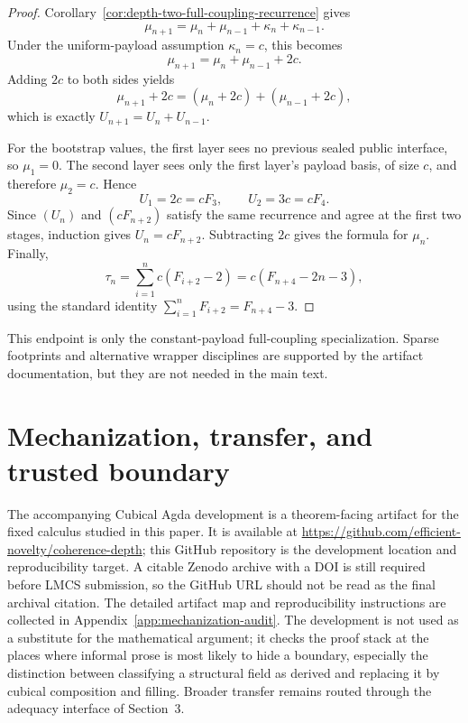\documentclass{lmcs}
\begin{document}
\begin{proof}
Corollary~\ref{cor:depth-two-full-coupling-recurrence} gives
\[
  \mu_{n+1}
  =
  \mu_n+\mu_{n-1}+\kappa_n+\kappa_{n-1}.
\]
Under the uniform-payload assumption \(\kappa_n=c\), this becomes
\[
  \mu_{n+1}=\mu_n+\mu_{n-1}+2c.
\]
Adding \(2c\) to both sides yields
\[
  \mu_{n+1}+2c
  =
  (\mu_n+2c)+(\mu_{n-1}+2c),
\]
which is exactly \(U_{n+1}=U_n+U_{n-1}\).

For the bootstrap values, the first layer sees no previous sealed public interface, so
\(\mu_1=0\).  The second layer sees only the first layer's payload basis, of size \(c\), and
therefore \(\mu_2=c\).  Hence
\[
  U_1=2c=cF_3,
  \qquad
  U_2=3c=cF_4.
\]
Since \((U_n)\) and \((cF_{n+2})\) satisfy the same recurrence and agree at the first two
stages, induction gives \(U_n=cF_{n+2}\).  Subtracting \(2c\) gives the formula for
\(\mu_n\).  Finally,
\[
  \tau_n
  =
  \sum_{i=1}^{n} c(F_{i+2}-2)
  =
  c(F_{n+4}-2n-3),
\]
using the standard identity \(\sum_{i=1}^n F_{i+2}=F_{n+4}-3\).
\end{proof}

This endpoint is only the constant-payload full-coupling specialization.  Sparse footprints and
alternative wrapper disciplines are supported by the artifact documentation, but they are not
needed in the main text.

\section{Mechanization, transfer, and trusted boundary}
\label{sec:mechanization}

The accompanying Cubical Agda development is a theorem-facing artifact for the fixed calculus
studied in this paper.  It is available at
\url{https://github.com/efficient-novelty/coherence-depth}; this GitHub repository is the
development location and reproducibility target.  A citable Zenodo archive with a DOI is still
required before LMCS submission, so the GitHub URL should not be read as the final archival
citation.  The detailed artifact map and reproducibility instructions are collected in
Appendix~\ref{app:mechanization-audit}.  The
development is not used as a substitute for the mathematical argument; it checks the proof
stack at the places where informal prose is most likely to hide a boundary, especially the
distinction between classifying a structural field as derived and replacing it by cubical
composition and filling.  Broader transfer remains routed through the adequacy interface of
Section~3.
\end{document}
